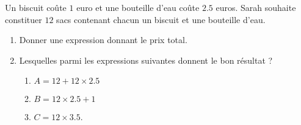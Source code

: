 
\begin{exercice}\label{exosmath-0740}

    Un biscuit coûte \( 1\) euro et une bouteille d'eau coûte \( 2.5\) euros. Sarah souhaite constituer \( 12\) sacs contenant chacun un biscuit et une bouteille d'eau. 

    \begin{enumerate}
        \item
            Donner une expression donnant le prix total.
        \item
            Lesquelles parmi les expressions suivantes donnent le bon résultat ?
            \begin{enumerate}
                \item
                    \( A=12+12\times 2.5\)
                \item
                    \( B=12\times 2.5+1\)
                \item
                    \( C=12\times 3.5\).
            \end{enumerate}
    \end{enumerate}

\end{exercice}
